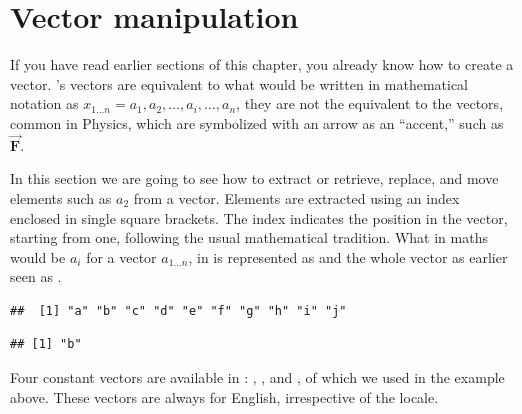 \documentclass[krantz2]{krantz}\usepackage{knitr}
\begin{document}

\section{Vector manipulation}\label{sec:vectors}\label{sec:calc:indexing}
If you have read earlier sections of this chapter, you already know how to create a vector. \Rlang's vectors are equivalent to what would be written in mathematical notation as $x_{1\ldots n} = a_1, a_2, \ldots, a_i, \ldots, a_n$, they are not the equivalent to the vectors, common in Physics, which are symbolized with an arrow as an ``accent,'' such as $\overrightarrow{\mathbf{F}}$.

In this section we are going to see how to extract or retrieve, replace, and move elements such as $a_2$ from a vector. Elements are extracted using an index enclosed in single square brackets. The index indicates the position in the vector, starting from one, following the usual mathematical tradition. What in maths would be $a_i$ for a vector $a_{1\ldots n}$, in \Rpgrm is represented as  and the whole vector as earlier seen as .

\begin{knitrout}\footnotesize
{}\color{fgcolor}\begin{kframe}
\begin{alltt}
 \hlkwb{<-} \hlstd{letters[}\hlopt{:}\hlstd{]}
\end{alltt}
\begin{verbatim}
##  [1] "a" "b" "c" "d" "e" "f" "g" "h" "i" "j"
\end{verbatim}
\begin{alltt}
\hlstd{a[}\hlstd{]}
\end{alltt}
\begin{verbatim}
## [1] "b"
\end{verbatim}
\end{kframe}
\end{knitrout}

\begin{explainbox}
Four constant vectors are available in \Rlang: , ,  and  , of which we used  in the example above. These vectors are always for English, irrespective of the locale.
\end{explainbox}
\end{document}
